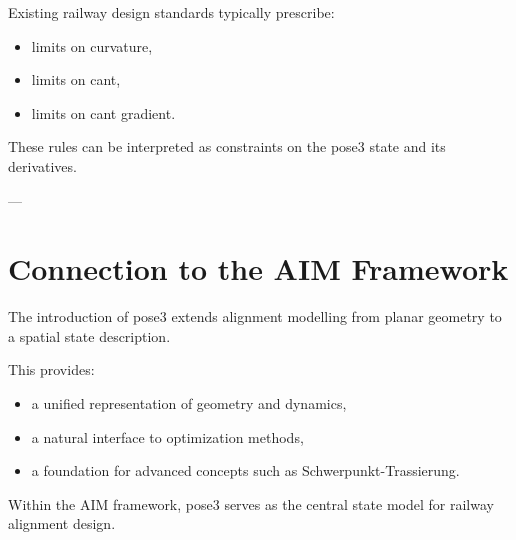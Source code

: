 \begin{remark}
Existing railway design standards typically prescribe:
\begin{itemize}
\item limits on curvature,
\item limits on cant,
\item limits on cant gradient.
\end{itemize}
\end{remark}

\begin{remark}
These rules can be interpreted as constraints on the pose3 state and
its derivatives.
\end{remark}

---

\section{Connection to the AIM Framework}

\begin{summary}
The introduction of pose3 extends alignment modelling from planar
geometry to a spatial state description.

This provides:
\begin{itemize}
\item a unified representation of geometry and dynamics,
\item a natural interface to optimization methods,
\item a foundation for advanced concepts such as
Schwerpunkt-Trassierung.
\end{itemize}

Within the AIM framework, pose3 serves as the central state model for
railway alignment design.
\end{summary}
